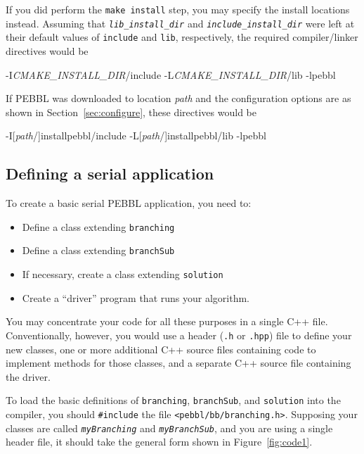 If you did perform the \texttt{make install} step, you may specify the install
locations instead.  Assuming that \emph{\texttt{lib\_install\_dir}} and
\emph{\texttt{include\_install\_dir}} were left at their default values of
\texttt{include} and \texttt{lib}, respectively, the required compiler/linker
directives would be
\begin{codeblock}
-I\emph{CMAKE\_INSTALL\_DIR}/include
-L\emph{CMAKE\_INSTALL\_DIR}/lib -lpebbl
\end{codeblock}
If PEBBL was downloaded to location \emph{path} and the configuration options
are as shown in Section~\ref{sec:configure}, these directives would be
\begin{codeblock}
-I\textrm{[\emph{path}}/\textrm{]}installpebbl/include
-L\textrm{[\emph{path}}/\textrm{]}installpebbl/lib -lpebbl
\end{codeblock}


\subsection{Defining a serial application}
\label{sec:serialMethods}
To create a basic serial PEBBL application, you need to:
\begin{itemize}
\item Define a class extending \texttt{branching}
\item Define a class extending \texttt{branchSub}
\item If necessary, create a class extending \texttt{solution}
\item Create a ``driver'' program that runs your algorithm.
\end{itemize}
You may concentrate your code for all these purposes in a single C++
file.  Conventionally, however, you would use a header (\texttt{.h} or
\texttt{.hpp}) file to define your new classes, one or more additional
C++ source files containing code to implement methods for those
classes, and a separate C++ source file containing the driver.

To load the basic definitions of \texttt{branching},
\texttt{branchSub}, and \texttt{solution} 
into the compiler, you should \texttt{\#include}
the file \texttt{<pebbl/bb/branching.h>}.  Supposing your classes are
called \texttt{\emph{myBranching}} and \texttt{\emph{myBranchSub}},
and you are using a single header file, it should take the general
form shown in Figure~\ref{fig:code1}.

